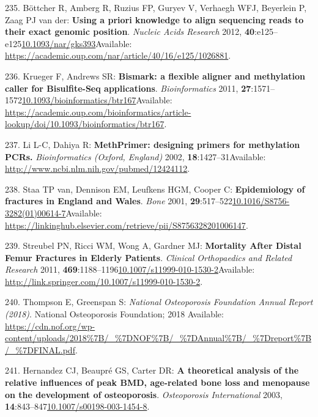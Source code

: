 \documentclass[
]{book}
\begin{document}
\leavevmode\hypertarget{ref-Bottcher2012}{}%
235. Böttcher R, Amberg R, Ruzius FP, Guryev V, Verhaegh WFJ, Beyerlein P, Zaag PJ van der: \textbf{Using a priori knowledge to align sequencing reads to their exact genomic position}. \emph{Nucleic Acids Research} 2012, \textbf{40}:e125--e125\href{https://doi.org/10.1093/nar/gks393}{10.1093/nar/gks393}Available: \url{https://academic.oup.com/nar/article/40/16/e125/1026881}.

\leavevmode\hypertarget{ref-Krueger2011}{}%
236. Krueger F, Andrews SR: \textbf{Bismark: a flexible aligner and methylation caller for Bisulfite-Seq applications}. \emph{Bioinformatics} 2011, \textbf{27}:1571--1572\href{https://doi.org/10.1093/bioinformatics/btr167}{10.1093/bioinformatics/btr167}Available: \url{https://academic.oup.com/bioinformatics/article-lookup/doi/10.1093/bioinformatics/btr167}.

\leavevmode\hypertarget{ref-Li2002}{}%
237. Li L-C, Dahiya R: \textbf{MethPrimer: designing primers for methylation PCRs.} \emph{Bioinformatics (Oxford, England)} 2002, \textbf{18}:1427--31Available: \url{http://www.ncbi.nlm.nih.gov/pubmed/12424112}.

\leavevmode\hypertarget{ref-VanStaa2001}{}%
238. Staa TP van, Dennison EM, Leufkens HGM, Cooper C: \textbf{Epidemiology of fractures in England and Wales}. \emph{Bone} 2001, \textbf{29}:517--522\href{https://doi.org/10.1016/S8756-3282(01)00614-7}{10.1016/S8756-3282(01)00614-7}Available: \url{https://linkinghub.elsevier.com/retrieve/pii/S8756328201006147}.

\leavevmode\hypertarget{ref-Streubel2011}{}%
239. Streubel PN, Ricci WM, Wong A, Gardner MJ: \textbf{Mortality After Distal Femur Fractures in Elderly Patients}. \emph{Clinical Orthopaedics and Related Research} 2011, \textbf{469}:1188--1196\href{https://doi.org/10.1007/s11999-010-1530-2}{10.1007/s11999-010-1530-2}Available: \url{http://link.springer.com/10.1007/s11999-010-1530-2}.

\leavevmode\hypertarget{ref-Thompson2018}{}%
240. Thompson E, Greenspan S: \emph{National Osteoporosis Foundation Annual Report (2018)}. National Osteoporosis Foundation; 2018 Available: \url{https://cdn.nof.org/wp-content/uploads/2018\%7B/_\%7DNOF\%7B/_\%7DAnnual\%7B/_\%7Dreport\%7B/_\%7DFINAL.pdf}.

\leavevmode\hypertarget{ref-Hernandez2003}{}%
241. Hernandez CJ, Beaupré GS, Carter DR: \textbf{A theoretical analysis of the relative influences of peak BMD, age-related bone loss and menopause on the development of osteoporosis}. \emph{Osteoporosis International} 2003, \textbf{14}:843--847\href{https://doi.org/10.1007/s00198-003-1454-8}{10.1007/s00198-003-1454-8}.
\end{document}
